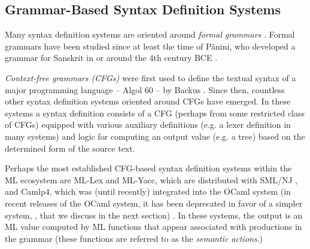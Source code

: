 

\subsection{Grammar-Based Syntax Definition Systems}\label{sec:grammars}\label{sec:syntax-dialects}
Many syntax definition systems are oriented around \emph{formal grammars} \cite{hopcroft1979introduction}. Formal grammars have been studied since at least the time of P\~anini, who developed a grammar for Sanskrit in or around the 4th century BCE \cite{Ingerman:1967:LFS:363162.363165}. 

\emph{Context-free grammars (CFGs)} were first used to define the textual syntax of a major programming language -- Algol 60 -- by Backus \cite{naur1963revised}. Since then, countless other syntax definition systems oriented around CFGs have emerged. In these systems a syntax definition consists of a CFG (perhaps from some restricted class of CFGs) equipped with various auxiliary definitions (e.g. a lexer definition in many systems) and logic for computing an output value (e.g. a tree) based on the determined form of the source text.%


Perhaps the most established CFG-based syntax definition systems within the ML ecosystem are ML-Lex  and ML-Yacc, which are distributed with SML/NJ \cite{TarditiDR:mly}, and Camlp4, which was (until recently)  integrated into  the OCaml system (in recent releases of the OCaml system, it has been deprecated in favor of a simpler system, , that we discuss in the next section) \cite{ocaml-manual}. In these systems, the output is an ML value computed by ML functions that appear associated with productions in the grammar (these functions are referred to as the \emph{semantic actions}.) 

